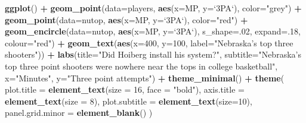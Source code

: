 \documentclass[
]{book}
\newenvironment{Shaded}{\begin{snugshade}}{\end{snugshade}}
\newcommand{\DataTypeTok}[1]{\textcolor[rgb]{0.13,0.29,0.53}{#1}}
\newcommand{\DecValTok}[1]{\textcolor[rgb]{0.00,0.00,0.81}{#1}}
\newcommand{\KeywordTok}[1]{\textcolor[rgb]{0.13,0.29,0.53}{\textbf{#1}}}
\newcommand{\NormalTok}[1]{#1}
\newcommand{\OperatorTok}[1]{\textcolor[rgb]{0.81,0.36,0.00}{\textbf{#1}}}
\newcommand{\StringTok}[1]{\textcolor[rgb]{0.31,0.60,0.02}{#1}}
\begin{document}
\begin{Shaded}
\begin{Highlighting}[]
\KeywordTok{ggplot}\NormalTok{() }\OperatorTok{+}\StringTok{ }\KeywordTok{geom_point}\NormalTok{(}\DataTypeTok{data=}\NormalTok{players, }\KeywordTok{aes}\NormalTok{(}\DataTypeTok{x=}\NormalTok{MP, }\DataTypeTok{y=}\StringTok{`}\DataTypeTok{3PA}\StringTok{`}\NormalTok{), }\DataTypeTok{color=}\StringTok{"grey"}\NormalTok{) }\OperatorTok{+}\StringTok{ }\KeywordTok{geom_point}\NormalTok{(}\DataTypeTok{data=}\NormalTok{nutop, }\KeywordTok{aes}\NormalTok{(}\DataTypeTok{x=}\NormalTok{MP, }\DataTypeTok{y=}\StringTok{`}\DataTypeTok{3PA}\StringTok{`}\NormalTok{), }\DataTypeTok{color=}\StringTok{"red"}\NormalTok{) }\OperatorTok{+}\StringTok{ }\KeywordTok{geom_encircle}\NormalTok{(}\DataTypeTok{data=}\NormalTok{nutop, }\KeywordTok{aes}\NormalTok{(}\DataTypeTok{x=}\NormalTok{MP, }\DataTypeTok{y=}\StringTok{`}\DataTypeTok{3PA}\StringTok{`}\NormalTok{), }\DataTypeTok{s_shape=}\NormalTok{.}\DecValTok{02}\NormalTok{, }\DataTypeTok{expand=}\NormalTok{.}\DecValTok{18}\NormalTok{, }\DataTypeTok{colour=}\StringTok{"red"}\NormalTok{) }\OperatorTok{+}
\StringTok{  }\KeywordTok{geom_text}\NormalTok{(}\KeywordTok{aes}\NormalTok{(}\DataTypeTok{x=}\DecValTok{400}\NormalTok{, }\DataTypeTok{y=}\DecValTok{100}\NormalTok{, }\DataTypeTok{label=}\StringTok{"Nebraska's top three shooters"}\NormalTok{)) }\OperatorTok{+}\StringTok{ }
\StringTok{  }\KeywordTok{labs}\NormalTok{(}\DataTypeTok{title=}\StringTok{"Did Hoiberg install his system?"}\NormalTok{, }\DataTypeTok{subtitle=}\StringTok{"Nebraska's top three point shooters were nowhere near the tops in college basketball"}\NormalTok{, }\DataTypeTok{x=}\StringTok{"Minutes"}\NormalTok{, }\DataTypeTok{y=}\StringTok{"Three point attempts"}\NormalTok{) }\OperatorTok{+}\StringTok{ }
\StringTok{  }\KeywordTok{theme_minimal}\NormalTok{() }\OperatorTok{+}\StringTok{ }
\StringTok{  }\KeywordTok{theme}\NormalTok{(}
    \DataTypeTok{plot.title =} \KeywordTok{element_text}\NormalTok{(}\DataTypeTok{size =} \DecValTok{16}\NormalTok{, }\DataTypeTok{face =} \StringTok{"bold"}\NormalTok{),}
    \DataTypeTok{axis.title =} \KeywordTok{element_text}\NormalTok{(}\DataTypeTok{size =} \DecValTok{8}\NormalTok{), }
    \DataTypeTok{plot.subtitle =} \KeywordTok{element_text}\NormalTok{(}\DataTypeTok{size=}\DecValTok{10}\NormalTok{), }
    \DataTypeTok{panel.grid.minor =} \KeywordTok{element_blank}\NormalTok{()}
\NormalTok{    )}
\end{Highlighting}
\end{Shaded}
\end{document}
